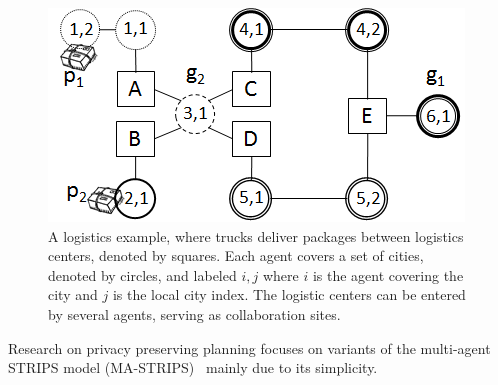 \documentclass[letterpaper]{article}
\theoremstyle{definition}
\begin{document}
\begin{figure}
\centering
\includegraphics[width=\columnwidth]{Logistics}
\caption{A logistics example, where trucks deliver packages between logistics centers, denoted by squares. Each agent covers a set of cities, denoted by circles, and labeled $i,j$ where $i$ is the agent covering the city and $j$ is the local city index. The logistic centers can be entered by several agents, serving as collaboration sites.}
\label{fig:logistics}
\end{figure}


Research on privacy preserving planning focuses on variants of the multi-agent STRIPS model (MA-STRIPS)~\cite{brafman2013complexity} mainly due to its simplicity. 


\end{document}
